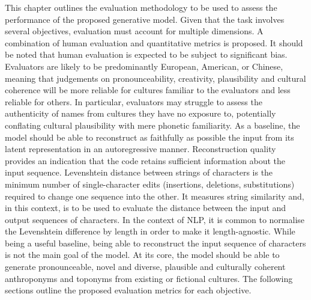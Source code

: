 \documentclass[Main.tex]{subfiles}
\begin{document}
\label{ch:evaluation plan}

This chapter outlines the evaluation methodology to be used to assess the performance of the proposed generative model. Given that the task involves several objectives, evaluation must account for multiple dimensions. A combination of human evaluation and quantitative metrics is proposed. It should be noted that human evaluation is expected to be subject to significant bias. Evaluators are likely to be predominantly European, American, or Chinese, meaning that judgements on pronounceability, creativity, plausibility and cultural coherence will be more reliable for cultures familiar to the evaluators and less reliable for others. In particular, evaluators may struggle to assess the authenticity of names from cultures they have no exposure to, potentially conflating cultural plausibility with mere phonetic familiarity. As a baseline, the model should be able to reconstruct as faithfully as possible the input from its latent representation in an autoregressive manner. Reconstruction quality provides an indication that the code retains sufficient information about the input sequence. Levenshtein distance \cite{levenshtein_1966} between strings of characters is the minimum number of single-character edits (insertions, deletions, substitutions) required to change one sequence into the other. It measures string similarity and, in this context, is to be used to evaluate the distance between the input and output sequences of characters. In the context of NLP, it is common to normalise the Levenshtein difference by length in order to make it length-agnostic. While being a useful baseline, being able to reconstruct the input sequence of characters is not the main goal of the model. At its core, the model should be able to generate pronounceable, novel and diverse, plausible and culturally coherent anthroponyms and toponyms from existing or fictional cultures. The following sections outline the proposed evaluation metrics for each objective.\\
\end{document}
